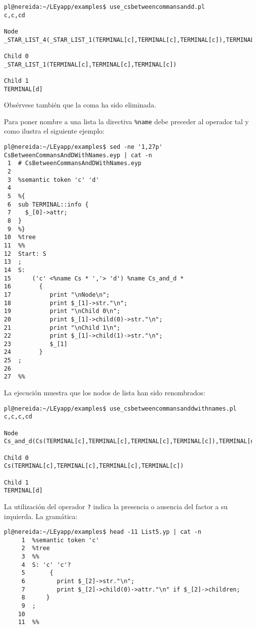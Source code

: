 \begin{verbatim}
pl@nereida:~/LEyapp/examples$ use_csbetweencommansandd.pl
c,c,cd

Node
_STAR_LIST_4(_STAR_LIST_1(TERMINAL[c],TERMINAL[c],TERMINAL[c]),TERMINAL[d])

Child 0
_STAR_LIST_1(TERMINAL[c],TERMINAL[c],TERMINAL[c])

Child 1
TERMINAL[d]
\end{verbatim}
Obsérvese también que la coma ha sido eliminada. 


Para poner nombre a una lista la directiva \verb|%name| debe preceder al operador
tal y como ilustra el siguiente ejemplo:

\begin{verbatim}
pl@nereida:~/LEyapp/examples$ sed -ne '1,27p' CsBetweenCommansAndDWithNames.eyp | cat -n
 1  # CsBetweenCommansAndDWithNames.eyp
 2
 3  %semantic token 'c' 'd'
 4
 5  %{
 6  sub TERMINAL::info {
 7    $_[0]->attr;
 8  }
 9  %}
10  %tree
11  %%
12  Start: S
13  ;
14  S:
15      ('c' <%name Cs * ','> 'd') %name Cs_and_d *
16        {
17           print "\nNode\n";
18           print $_[1]->str."\n";
19           print "\nChild 0\n";
20           print $_[1]->child(0)->str."\n";
21           print "\nChild 1\n";
22           print $_[1]->child(1)->str."\n";
23           $_[1]
24        }
25  ;
26
27  %%
\end{verbatim}
La ejecución muestra que 
los nodos de lista han sido renombrados:
\begin{verbatim}
pl@nereida:~/LEyapp/examples$ use_csbetweencommansanddwithnames.pl
c,c,c,cd

Node
Cs_and_d(Cs(TERMINAL[c],TERMINAL[c],TERMINAL[c],TERMINAL[c]),TERMINAL[d])

Child 0
Cs(TERMINAL[c],TERMINAL[c],TERMINAL[c],TERMINAL[c])

Child 1
TERMINAL[d]
\end{verbatim}


La utilización del operador \verb|?| indica la presencia
o ausencia del factor a su izquierda.
La gramática:
\begin{verbatim}
pl@nereida:~/LEyapp/examples$ head -11 List5.yp | cat -n
     1  %semantic token 'c'
     2  %tree
     3  %%
     4  S: 'c' 'c'?
     5       {
     6         print $_[2]->str."\n";
     7         print $_[2]->child(0)->attr."\n" if $_[2]->children;
     8      }
     9  ;
    10
    11  %%
\end{verbatim}


